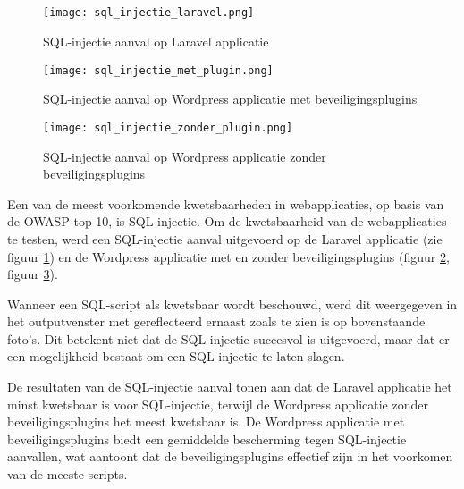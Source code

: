 \subsection{}
\begin{figure}
    \centering
    \texttt{[image: sql\_injectie\_laravel.png]}
    \caption[SQL-injectie aanval op Laravel applicatie]{SQL-injectie aanval op Laravel applicatie}
    \label{fig:injectie_laravel}
\end{figure}
\begin{figure}
    \centering
    \texttt{[image: sql\_injectie\_met\_plugin.png]}
    \caption[SQL-injectie aanval op Wordpress applicatie met beveiligingsplugins]{SQL-injectie aanval op Wordpress applicatie met beveiligingsplugins}
    \label{fig:injectie_zonder}
\end{figure}
\begin{figure}
    \centering
    \texttt{[image: sql\_injectie\_zonder\_plugin.png]}
    \caption[SQL-injectie aanval op Wordpress applicatie zonder beveiligingsplugins]{SQL-injectie aanval op Wordpress applicatie zonder beveiligingsplugins}
    \label{fig:injectie_met}
\end{figure}


Een van de meest voorkomende kwetsbaarheden in webapplicaties, op basis van de OWASP top 10, is SQL-injectie. Om de 
kwetsbaarheid van de webapplicaties 
te testen, werd een SQL-injectie aanval uitgevoerd op de Laravel applicatie (zie figuur \ref{fig:injectie_laravel}) en de 
Wordpress applicatie met en zonder beveiligingsplugins (figuur \ref{fig:injectie_zonder}, figuur \ref{fig:injectie_met}). 

Wanneer een SQL-script als kwetsbaar wordt beschouwd, werd dit weergegeven in het outputvenster met gereflecteerd ernaast 
zoals te zien is op bovenstaande foto's. 
Dit betekent niet dat de SQL-injectie succesvol is uitgevoerd, maar dat er een mogelijkheid bestaat om een SQL-injectie te laten 
slagen. 

De resultaten van de SQL-injectie aanval tonen aan dat de Laravel applicatie het minst kwetsbaar is voor SQL-injectie, terwijl 
de Wordpress applicatie zonder beveiligingsplugins het meest kwetsbaar is. De Wordpress applicatie met beveiligingsplugins 
biedt een gemiddelde bescherming tegen SQL-injectie aanvallen, wat aantoont dat de beveiligingsplugins effectief zijn in het 
voorkomen van de meeste scripts. 

